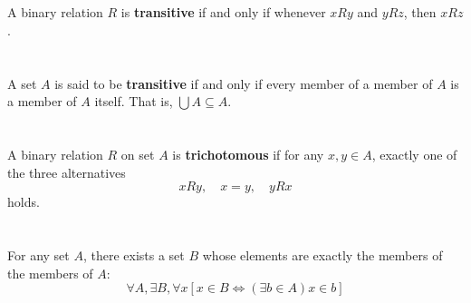 \documentclass{report}
\begin{document}
\section{}%

A binary relation $R$ is \textbf{transitive} if and only if whenever $xRy$ and
  $yRz$, then $xRz$.

\begin{definition}

  \statementpadding



\end{definition}

\section{}%

A set $A$ is said to be \textbf{transitive} if and only if every member of a
  member of $A$ is a member of $A$ itself.
That is, $\bigcup A \subseteq A$.

\section{}%

A binary relation $R$ on set $A$ is \textbf{trichotomous} if for any
  $x, y \in A$, exactly one of the three alternatives
  $$xRy, \quad x = y, \quad yRx$$
  holds.

\begin{definition}


\end{definition}

\section{}%

For any set $A$, there exists a set $B$ whose elements are exactly the members
  of the members of $A$:
  $$\forall A, \exists B, \forall x
    \left[ x \in B \iff (\exists b \in A) x \in b \right]$$

\begin{axiom}


\end{axiom}
\end{document}

